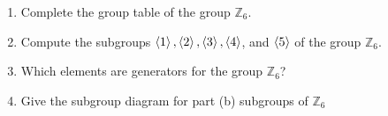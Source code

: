 \newpage
\begin{exercise}
    \begin{enumerate}[label={\textbf{\alph*.}}]
        \item Complete the group table of the group $\mathbb{Z}_{6}$.
        \item Compute the subgroups $\left\langle{1}\right\rangle, \left\langle{2}\right\rangle, \left\langle{3}\right\rangle, \left\langle{4}\right\rangle$, and $\left\langle{5}\right\rangle$ of the group $\mathbb{Z}_{6}$.
        \item Which elements are generators for the group $\mathbb{Z}_{6}$?
        \item Give the subgroup diagram for part (b) subgroups of $\mathbb{Z}_{6}$
    \end{enumerate}
\end{exercise}

